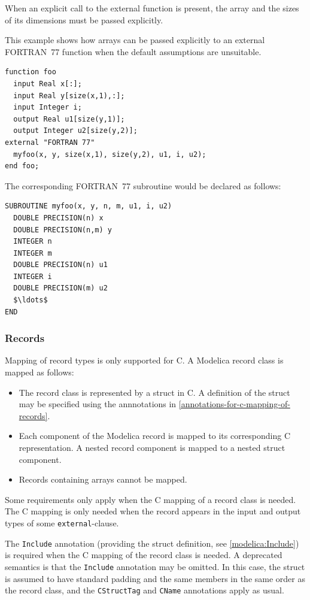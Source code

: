 When an explicit call to the external function is present, the array and the sizes of its dimensions must be passed explicitly.

\begin{example}
This example shows how arrays can be passed explicitly to an external FORTRAN~77 function when the default assumptions are unsuitable.

\begin{lstlisting}[language=modelica]
function foo
  input Real x[:];
  input Real y[size(x,1),:];
  input Integer i;
  output Real u1[size(y,1)];
  output Integer u2[size(y,2)];
external "FORTRAN 77"
  myfoo(x, y, size(x,1), size(y,2), u1, i, u2);
end foo;
\end{lstlisting}
The corresponding FORTRAN~77 subroutine would be declared as follows:
\begin{lstlisting}[language=FORTRAN77]
SUBROUTINE myfoo(x, y, n, m, u1, i, u2)
  DOUBLE PRECISION(n) x
  DOUBLE PRECISION(n,m) y
  INTEGER n
  INTEGER m
  DOUBLE PRECISION(n) u1
  INTEGER i
  DOUBLE PRECISION(m) u2
  $\ldots$
END
\end{lstlisting}
\end{example}

\subsubsection{Records}\label{records}

Mapping of record types is only supported for C.
A Modelica record class is mapped as follows:
\begin{itemize}
\item
  The record class is represented by a struct in C.
  A definition of the struct may be specified using the annnotations in \cref{annotations-for-c-mapping-of-records}.
\item
  Each component of the Modelica record is mapped to its corresponding C representation.
  A nested record component is mapped to a nested struct component.
\item
  Records containing arrays cannot be mapped.
\end{itemize}

Some requirements only apply when the C mapping of a record class is needed.
The C mapping is only needed when the record appears in the input and output types of some \lstinline!external!-clause.

The \lstinline!Include! annotation (providing the struct definition, see \cref{modelica:Include}) is required when the C mapping of the record class is needed.
A deprecated semantics is that the \lstinline!Include! annotation may be omitted.
In this case, the struct is assumed to have standard padding and the same members in the same order as the record class, and the \lstinline!CStructTag! and \lstinline!CName! annotations apply as usual.

